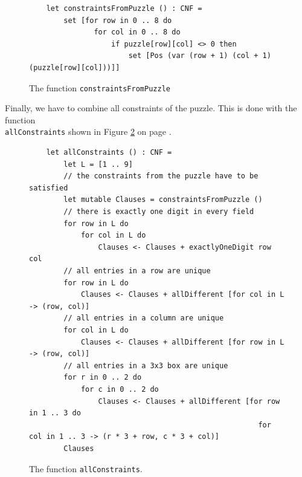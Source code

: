 \begin{figure}[!ht]
\centering
\begin{verbatim}
    let constraintsFromPuzzle () : CNF =
        set [for row in 0 .. 8 do
               for col in 0 .. 8 do
                   if puzzle[row][col] <> 0 then
                       set [Pos (var (row + 1) (col + 1) (puzzle[row][col]))]]
\end{verbatim}
\vspace*{-0.3cm}
\caption{The function \texttt{constraintsFromPuzzle}}
\label{fig:sudoku-constraintsFromPuzzle}
\end{figure}

Finally, we have to combine all constraints of the puzzle.  This is done with the function \\
\texttt{allConstraints} shown in Figure \ref{fig:sudoku-allConstraints} on page \pageref{fig:sudoku-allConstraints}.

\begin{figure}[!ht]
\centering
\begin{verbatim}
    let allConstraints () : CNF =
        let L = [1 .. 9]
        // the constraints from the puzzle have to be satisfied
        let mutable Clauses = constraintsFromPuzzle ()
        // there is exactly one digit in every field
        for row in L do
            for col in L do
                Clauses <- Clauses + exactlyOneDigit row col
        // all entries in a row are unique
        for row in L do
            Clauses <- Clauses + allDifferent [for col in L -> (row, col)]
        // all entries in a column are unique
        for col in L do
            Clauses <- Clauses + allDifferent [for row in L -> (row, col)]
        // all entries in a 3x3 box are unique
        for r in 0 .. 2 do
            for c in 0 .. 2 do
                Clauses <- Clauses + allDifferent [for row in 1 .. 3 do
                                                     for col in 1 .. 3 -> (r * 3 + row, c * 3 + col)]
        Clauses
\end{verbatim}
\vspace*{-0.3cm}
\caption{The function \texttt{allConstraints}.}
\label{fig:sudoku-allConstraints}
\end{figure}

